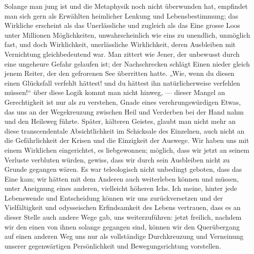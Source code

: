 Solange man jung ist und die Metaphysik noch nicht überwunden hat, empfindet man sich gern als Erwählten heimlicher Lenkung und Lebensbestimmung; das Wirkliche erscheint als das Unerlässliche und zugleich als das Eine grosse Loos unter Millionen Möglichkeiten, unwahrscheinlich wie eins zu unendlich, unmöglich fast, und doch Wirklichkeit, unerlässliche Wirklichkeit, deren Ausbleiben mit Vernichtung gleichbedeutend war. Man zittert wie Jener, der unbewusst durch eine ungeheure Gefahr gelaufen ist; der Nachschrecken schlägt Einen nieder gleich jenem Reiter, der den gefrorenen See überritten hatte. „Wie, wenn du diesen einen Glücksfall verfehlt hättest! und du hättest ihn natürlicherweise verfehlen müssen!“ über diese Logik kommt man nicht hinweg, — dieser Mangel an Gerechtigkeit ist nur als  zu verstehen, Gnade eines verehrungswürdigen Etwas, das uns an der Wegekreuzung zwischen Heil und Verderben bei der Hand nahm und den Heilsweg führte. Später, kälteren Geistes, glaubt man nicht mehr an diese transcendentale Absichtlichkeit im Schicksale des Einzelnen, auch nicht an die Gefährlichkeit der Krisen und die Einzigkeit der Auswege. Wir haben uns mit einem Wirklichen eingerichtet, es liebgewonnen; möglich, dass wir jetzt an seinem Verluste verbluten würden, gewiss, dass wir durch sein Ausbleiben  nicht zu Grunde gegangen wären. Es war teleologisch nicht unbedingt geboten, dass das Eine kam; wir hätten mit dem Anderen auch weiterleben können und müssen, unter Aneignung eines anderen, vielleicht höheren Ichs. Ich meine, hinter jede Lebenswende und Entscheidung können wir uns zurückversetzen und der Vielfältigkeit und odysseischen Erfindsamkeit des Lebens vertrauen, dass es an dieser Stelle auch andere Wege gab, uns weiterzuführen: jetzt freilich, nachdem wir den einen von ihnen solange gegangen sind, können wir den Querübergang auf einen anderen Weg uns nur als vollständige Durchkreuzung und Verneinung unserer gegenwärtigen Persönlichkeit und Bewegungsrichtung vorstellen.
\par

